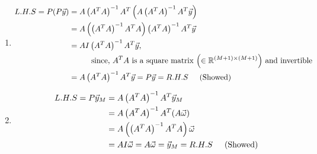 \documentclass[11pt]{article} %
\begin{document}
\begin{enumerate}
\begin{enumerate}[\textbf{(\alph*)}]
\renewcommand{\labelenumi}{\bfseries\theenumi.}
\item 
\begin{equation*}
\begin{split}
L.H.S = P(P\Vec y) &= A\left(A^TA\right)^{-1}A^T\left(A\left(A^TA\right)^{-1}A^T \Vec y\right)\\
&= A\left(\left(A^TA\right)^{-1}A^TA\right)\left(A^TA\right)^{-1}A^T \Vec y\\
&=AI\left(A^TA\right)^{-1}A^T \Vec y, \\
&\hspace{1cm} \text{since, $A^TA$ is a square matrix $\left(\in \mathbb R^{(M+1)\times(M+1)}\right)$ and invertible}\\
&= A\left(A^TA\right)^{-1}A^T \Vec y = P\Vec y = R.H.S \hspace{0.5cm} \text{(Showed)}
\end{split}
\end{equation*}

\item 
\begin{equation*}
\begin{split}
L.H.S = P\Vec y_M &= A\left(A^TA\right)^{-1}A^T \Vec y_M \\
&= A\left(A^TA\right)^{-1}A^T(A\Vec \omega)\\
&= A\left(\left(A^TA\right)^{-1}A^TA\right)\Vec \omega \\
&= AI\Vec \omega = A\Vec \omega = \Vec y_M = R.H.S \hspace{0.5cm} \text{(Showed)}
\end{split}
\end{equation*}


\end{enumerate}
\end{enumerate}
\end{document}

